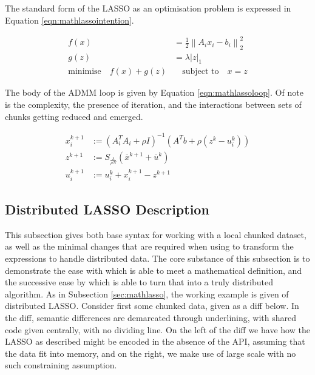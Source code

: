 The standard form of the LASSO as an optimisation problem is expressed in Equation \cref{eqn:mathlassointention}.

\begin{equation}\label{eqn:mathlassointention}
    \begin{aligned}
        f(x) &= \frac{1}{2} \left\| A_i x_i - b_i \right\|^2_2 \\
        g(z) &= \lambda \left| z \right|_1 \\
        \text{minimise} \quad f(x) + g(z) &\quad \text{subject to} \quad x = z
    \end{aligned} 
\end{equation}

The body of the ADMM loop is given by Equation \cref{eqn:mathlassoloop}.
Of note is the complexity, the presence of iteration, and the interactions between sets of chunks getting reduced and emerged.

\begin{equation}\label{eqn:mathlassoloop}
    \begin{aligned}
        x_i^{k+1} &:= (A_i^T A_i + \rho I)^{-1}(A^T b + \rho(z^k - u_i^k))\\
        z^{k+1} &:= S_\frac{\lambda}{\rho N} (\overline{x}^{k+1} + \overline{u}^k) \\
        u_i^{k+1} &:= u_i^k + x_i^{k+1} - z^{k+1}
    \end{aligned} 
\end{equation}

\subsection{Distributed LASSO \R Description}\label{sec:rlasso}

This subsection gives both base \R syntax for working with a local chunked dataset, as well as the minimal changes that are required when using  to transform the expressions to handle distributed data.
The core substance of this subsection is to demonstrate the ease with which  is able to meet a mathematical definition, and the successive ease by which  is able to turn that into a truly distributed algorithm.
As in Subsection \cref{sec:mathlasso}, the working example is given of distributed LASSO.
Consider first some chunked data, given as a diff below.
In the diff, semantic differences are demarcated through underlining, with shared code given centrally, with no dividing line.
On the left of the diff we have how the LASSO as described might be encoded in the absence of the API, assuming that the data fit into memory, and on the right, we make use of large scale \R with no such constraining assumption.

